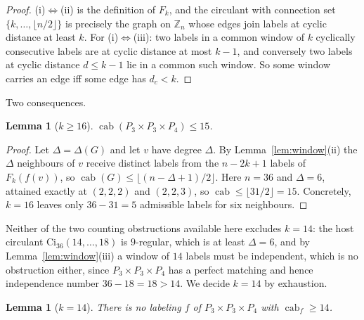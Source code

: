 \documentclass[11pt]{amsart}
\newtheorem{lemma}[theorem]{Lemma}
\theoremstyle{remark}
\DeclareMathOperator{\cab}{cab}
\begin{document}
\begin{proof}
(i)$\Leftrightarrow$(ii) is the definition of $F_k$, and the circulant with connection set
$\{k,\dots,\lfloor n/2\rfloor\}$ is precisely the graph on $\mathbb Z_n$ whose edges join labels
at cyclic distance at least $k$. For (i)$\Leftrightarrow$(iii): two labels in a common window of
$k$ cyclically consecutive labels are at cyclic distance at most $k-1$, and conversely two labels
at cyclic distance $d\le k-1$ lie in a common such window. So some window carries an edge iff
some edge has $d_c<k$.
\end{proof}

Two consequences.

\begin{lemma}[$k\ge16$]\label{lem:cap}
$\cab(P_3\times P_3\times P_4)\le15$.
\end{lemma}

\begin{proof}
Let $\Delta=\Delta(G)$ and let $v$ have degree $\Delta$. By Lemma~\ref{lem:window}(ii) the $\Delta$
neighbours of $v$ receive distinct labels from the $n-2k+1$ labels of $F_k(f(v))$, so
$\cab(G)\le\lfloor(n-\Delta+1)/2\rfloor$. Here $n=36$ and $\Delta=6$, attained exactly at
$(2,2,2)$ and $(2,2,3)$, so $\cab\le\lfloor31/2\rfloor=15$. Concretely, $k=16$ leaves only
$36-31=5$ admissible labels for six neighbours.
\end{proof}

Neither of the two counting obstructions available here excludes $k=14$: the host circulant
$\mathrm{Ci}_{36}(14,\dots,18)$ is $9$-regular, which is at least $\Delta=6$, and by
Lemma~\ref{lem:window}(iii) a window of $14$ labels must be independent, which is no obstruction
either, since $P_3\times P_3\times P_4$ has a perfect matching and hence independence number
$36-18=18>14$. We decide $k=14$ by exhaustion.

\begin{lemma}[$k=14$]\label{lem:search}
There is no labeling $f$ of $P_3\times P_3\times P_4$ with $\cab_f\ge14$.
\end{lemma}
\end{document}
